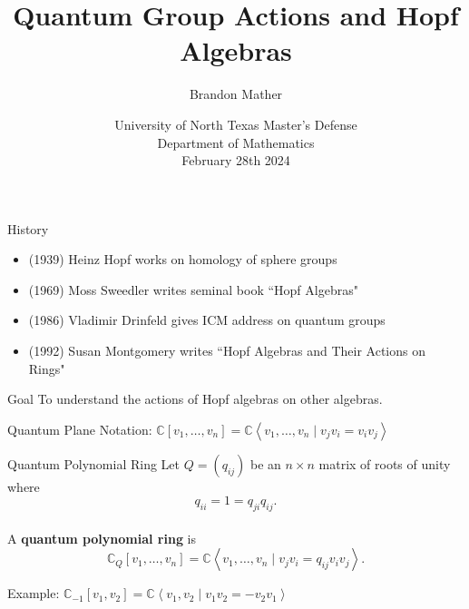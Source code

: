 \documentclass{beamer}
\title{Quantum Group Actions and Hopf Algebras}
\author{Brandon Mather}
\date{University of North Texas Master's Defense\\
Department of Mathematics \\February 28th 2024}
\newcommand\1{_{(1)}}
\newcommand\2{_{(2)}}
\begin{document}
\maketitle

\begin{frame}{History}
    \begin{itemize}\setlength{\itemindent}{-2ex}
        \item (1939) Heinz Hopf works on homology of sphere groups
        \item (1969) Moss Sweedler writes seminal book ``Hopf Algebras"
        \item (1986) Vladimir Drinfeld gives ICM address on quantum groups
        \item (1992) Susan Montgomery writes ``Hopf Algebras and Their Actions on Rings"
    \end{itemize}
    \begin{block}{Goal}
        To understand the actions of Hopf algebras on other algebras.
    \end{block}
\end{frame}

\begin{frame}{Quantum Plane}
    Notation: $\mathbb{C}[v_1,\ldots,v_n]=\mathbb{C}\left\langle v_1,\ldots,v_n\;\vert\; v_jv_i=v_iv_j\right\rangle$
    \begin{block}{Quantum Polynomial Ring}
        Let $Q=(q_{ij})$ be an $n\times n$ matrix of roots of unity where \[q_{ii}=1=q_{ji}q_{ij}.\]
        \\
        A \textbf{quantum polynomial ring} is \[\mathbb{C}_Q[v_1,\ldots,v_n]=\mathbb{C}\left\langle v_1,\ldots,v_n \;\vert\; v_jv_i=q_{ij}v_iv_j\right\rangle.\]
    \end{block}
    Example: $\mathbb{C}_{-1}[v_1,v_2]=\mathbb{C}\left\langle v_1,v_2\;\vert\; v_1 v_2=-v_2 v_1\right\rangle$
\end{frame}
\end{document}
